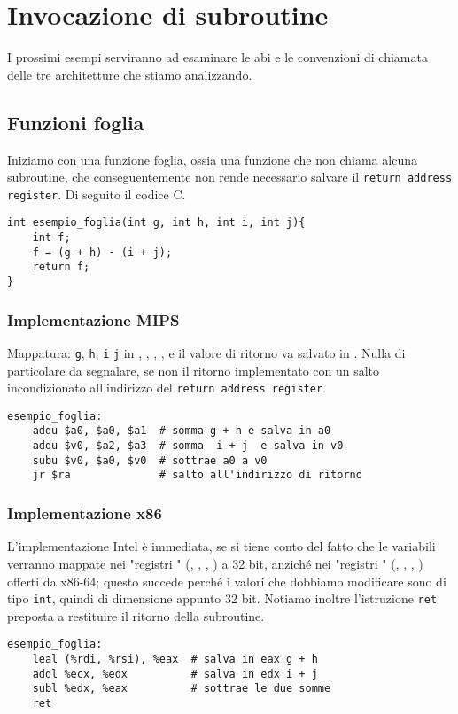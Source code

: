 \documentclass[class=book, crop=false, oneside]{standalone}
\begin{document}
\section{Invocazione di subroutine}
I prossimi esempi serviranno ad esaminare le \acrshort{abi} e le convenzioni di chiamata delle tre architetture che stiamo analizzando.
\subsection*{Funzioni foglia}
Iniziamo con una funzione foglia, ossia una funzione che non chiama alcuna subroutine, che conseguentemente non rende necessario salvare il \texttt{return address register}. Di seguito il codice C.
\begin{verbatim}
int esempio_foglia(int g, int h, int i, int j){
	int f;
	f = (g + h) - (i + j);
	return f;
}
\end{verbatim}

\subsubsection{Implementazione MIPS}
Mappatura: \texttt{g}, \texttt{h}, \texttt{i} \texttt{j} in , , , , e il valore di ritorno va salvato in . Nulla di particolare da segnalare, se non il ritorno implementato con un salto incondizionato all'indirizzo del \texttt{return address register}.
\begin{verbatim}
esempio_foglia:
	addu $a0, $a0, $a1  # somma g + h e salva in a0
	addu $v0, $a2, $a3  # somma  i + j  e salva in v0
	subu $v0, $a0, $v0  # sottrae a0 a v0
	jr $ra              # salto all'indirizzo di ritorno
\end{verbatim}

\subsubsection{Implementazione x86}
L'implementazione Intel è immediata, se si tiene conto del fatto che le variabili verranno mappate nei "registri " (, , , ) a 32 bit, anziché nei "registri " (, , , ) offerti da x86-64; questo succede perché i valori che dobbiamo modificare sono di tipo \texttt{int}, quindi di dimensione appunto 32 bit. Notiamo inoltre l'istruzione \texttt{ret} preposta a restituire il ritorno della subroutine.
\begin{verbatim}
esempio_foglia:
	leal (%rdi, %rsi), %eax  # salva in eax g + h
	addl %ecx, %edx          # salva in edx i + j
	subl %edx, %eax          # sottrae le due somme
	ret
\end{verbatim}
\end{document}
